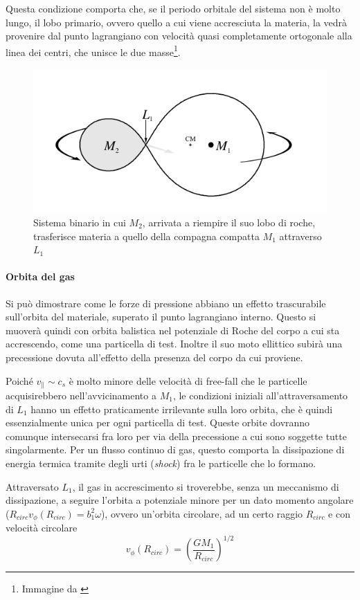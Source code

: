 \documentclass[a4paperbi]{article}
\begin{document}
	Questa condizione comporta che, se il periodo orbitale del sistema non è molto lungo, il lobo primario, ovvero quello a cui viene accresciuta la materia, la vedrà provenire dal punto lagrangiano con velocità quasi completamente ortogonale alla linea dei centri, che unisce le due masse\footnote{Immagine da \cite{FrankKingRaineAccretionPower}}.
	
	\begin{figure}[H]
		\centering
		\includegraphics[width=0.8\linewidth]{LobeFilling}
		\caption{Sistema binario in cui $M_2$, arrivata a riempire il suo lobo di roche, trasferisce materia a quello della compagna compatta $M_1$ attraverso $L_1$}
		\label{fig:lobefilling}
	\end{figure}
	

	\paragraph{Orbita del gas}	
	Si può dimostrare come le forze di pressione abbiano un effetto trascurabile sull'orbita del materiale, superato il punto lagrangiano interno. Questo si muoverà quindi con orbita balistica nel potenziale di Roche del corpo a cui sta accrescendo, come una particella di test. Inoltre il suo moto ellittico subirà una precessione dovuta all'effetto della presenza del corpo da cui proviene.
	
	Poiché $v_\parallel\sim c_s$ è molto minore delle velocità di free-fall che le particelle acquisirebbero nell'avvicinamento a $M_1$, le condizioni iniziali all'attraversamento di $L_1$ hanno un effetto praticamente irrilevante sulla loro orbita, che è quindi essenzialmente unica per ogni particella di test. Queste orbite dovranno comunque intersecarsi fra loro per via della precessione a cui sono soggette tutte singolarmente. Per un flusso continuo di gas, questo comporta la dissipazione di energia termica tramite degli urti (\textit{shock}) fra le particelle che lo formano. 
	
	Attraversato $L_1$, il gas in accrescimento si troverebbe, senza un meccanismo di dissipazione, a seguire l'orbita a potenziale minore per un dato momento angolare ($R_{circ}v_\phi(R_{circ})=b_1^2\omega$), ovvero un'orbita circolare, ad un certo raggio $R_{circ}$ e con velocità circolare
	\begin{equation}
		v_\phi(R_{circ})=\left(\frac{GM_1}{R_{circ}}\right)^{1/2}
	\end{equation}
	
\end{document}
